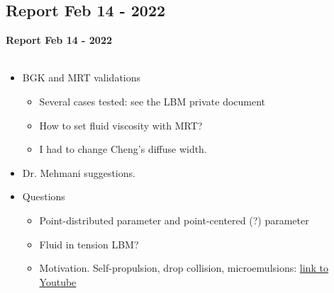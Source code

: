 \documentclass[8pt]{beamer}
\begin{document}
	\subsection{Report Feb 14 - 2022}
	\label{}
	\justifying
	\begin{frame}
		\textbf{Report Feb 14 - 2022}\\~\\
		\begin{itemize}
			
			\item BGK and MRT validations
			\begin{itemize}
				\item Several cases tested: see the LBM private document
				\item How to set fluid viscosity with MRT?
				\item I had to change Cheng's diffuse width.
			\end{itemize}
			
			\item Dr. Mehmani suggestions.
			\item Questions
			\begin{itemize}
				\item Point-distributed parameter and point-centered (?) parameter
				\item Fluid in tension LBM?
				\item Motivation. Self-propulsion, drop collision, microemulsions: \href{https://www.youtube.com/watch?v=arpGntfrg4s}{link to Youtube}
			\end{itemize}
			
		\end{itemize}
	\end{frame}
\end{document}
